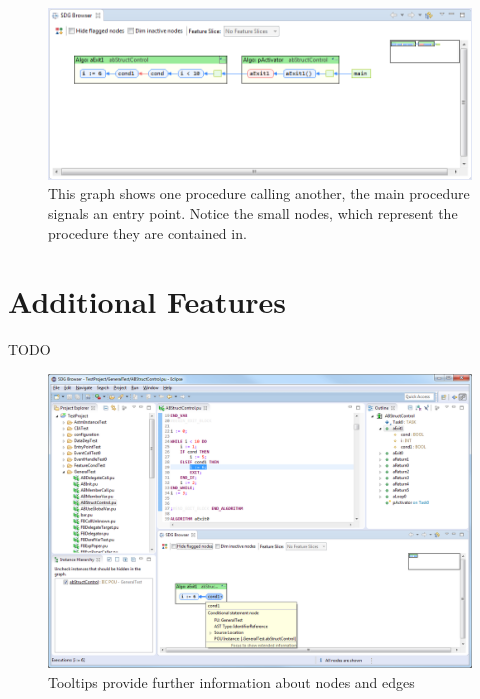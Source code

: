 \begin{figure}[hp]
  \centering
    \includegraphics[width=\textwidth]{bilder/manual-executions3}
  \caption{This graph shows one procedure calling another, the main procedure signals an entry point.
    Notice the small nodes, which represent the procedure they are contained in.}
  \label{fig:manual-executions3}
\end{figure}


\section{Additional Features} \label{sec:manual-features}

TODO

\begin{figure}[hp]
  \centering
    \includegraphics[width=\textwidth]{bilder/manual-tooltip}
  \caption{Tooltips provide further information about nodes and edges}
  \label{fig:manual-tooltip}
\end{figure}


